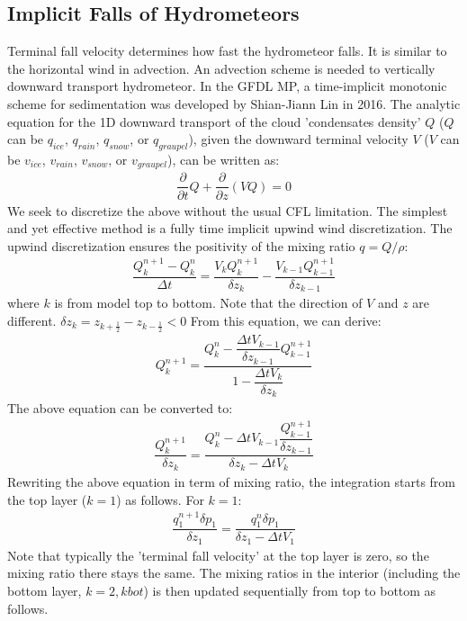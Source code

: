 \documentclass[letterpaper,titlepage,10pt]{article}
\numberwithin{equation}{section}
\begin{document}
\subsection{Implicit Falls of Hydrometeors}

Terminal fall velocity determines how fast the hydrometeor falls. It is similar to the horizontal wind in advection. An advection scheme is needed to vertically downward transport hydrometeor. In the GFDL MP, a time-implicit monotonic scheme for sedimentation was developed by Shian-Jiann Lin in 2016. The analytic equation for the 1D downward transport of the cloud 'condensates density' $Q$ ($Q$ can be $q_{ice}$, $q_{rain}$, $q_{snow}$, or $q_{graupel}$), given the downward terminal velocity $V$ ($V$ can be $v_{ice}$, $v_{rain}$, $v_{snow}$, or $v_{graupel}$), can be written as:
\begin{gather}
	\dfrac{\partial}{\partial t} Q + \dfrac{\partial}{\partial z} \left(V Q \right) = 0
\end{gather}
We seek to discretize the above without the usual CFL limitation. The simplest and yet effective method is a fully time implicit upwind wind discretization. The upwind discretization ensures the positivity of the mixing ratio $q = Q / \rho$:
\begin{gather}
	\dfrac{Q^{n+1}_k - Q^n_k}{\Delta t} = \dfrac{V_k Q^{n+1}_k}{\delta z_k} - \dfrac{V_{k-1} Q^{n+1}_{k-1}}{\delta z_{k-1}}
\end{gather}
where $k$ is from model top to bottom. Note that the direction of $V$ and $z$ are different. $\delta z_{k} = z_{k + \frac{1}{2}} - z_{k - \frac{1}{2}} < 0$ From this equation, we can derive:
\begin{gather} \label{eq:imp}
	Q^{n+1}_k = \dfrac{Q^{n}_k - \dfrac{\Delta t V_{k-1}}{\delta z_{k-1}} Q^{n+1}_{k-1}}{1 - \dfrac{\Delta t V_k}{\delta z_k}}
\end{gather}
The above equation can be converted to:
\begin{gather}
	\dfrac{Q^{n+1}_k}{\delta z_k} = \dfrac{Q^{n}_k - \Delta t V_{k-1} \dfrac{Q^{n+1}_{k-1}}{\delta z_{k-1}}}{\delta z_k - \Delta t V_k}
\end{gather}
Rewriting the above equation in term of mixing ratio, the integration starts from the top layer ($k=1$) as follows.
For $k = 1$:
\begin{gather}
	\dfrac{q^{n+1}_1 \delta p_1}{\delta z_1} = \dfrac{q^n_1 \delta p_1}{\delta z_1 - \Delta t V_1}
\end{gather}
Note that typically the 'terminal fall velocity' at the top layer is zero, so the mixing ratio there stays the same. The mixing ratios in the interior (including the bottom layer, $k=2,kbot$) is then updated sequentially from top to bottom as follows.
\end{document}

